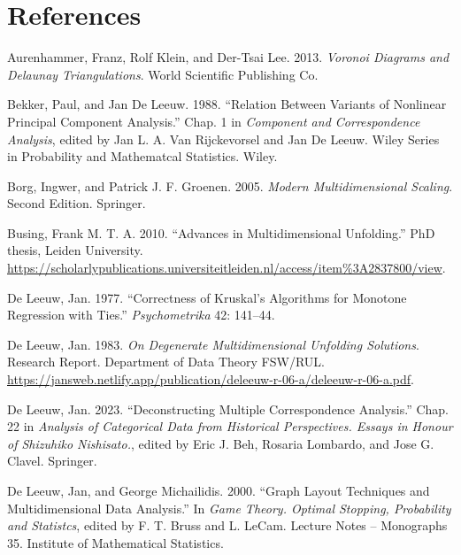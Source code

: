 \documentclass[
  12pt,
  letterpaper,
  DIV=11,
  numbers=noendperiod]{scrartcl}
\newlength{\cslhangindent}
\newenvironment{CSLReferences}[2] %
 {\begin{list}{}{%
  \setlength{\itemindent}{0pt}
  \setlength{\leftmargin}{0pt}
  \setlength{\parsep}{0pt}
  \ifodd #1
   \setlength{\leftmargin}{\cslhangindent}
   \setlength{\itemindent}{-1\cslhangindent}
  \fi
  \setlength{\itemsep}{#2\baselineskip}}}
 {\end{list}}
\newcommand{\sectionbreak}{\clearpage}
\begin{document}
\sectionbreak

\section*{References}\label{references}

\protect{}\label{refs}
\begin{CSLReferences}{1}{1}
Aurenhammer, Franz, Rolf Klein, and Der-Tsai Lee. 2013. \emph{Voronoi
Diagrams and Delaunay Triangulations}. World Scientific Publishing Co.

Bekker, Paul, and Jan De Leeuw. 1988. {``Relation Between Variants of
Nonlinear Principal Component Analysis.''} Chap. 1 in \emph{Component
and Correspondence Analysis}, edited by Jan L. A. Van Rijckevorsel and
Jan De Leeuw. Wiley Series in Probability and Mathematcal Statistics.
Wiley.

Borg, Ingwer, and Patrick J. F. Groenen. 2005. \emph{Modern
Multidimensional Scaling}. Second Edition. Springer.

Busing, Frank M. T. A. 2010. {``Advances in Multidimensional
Unfolding.''} PhD thesis, Leiden University.
\url{https://scholarlypublications.universiteitleiden.nl/access/item\%3A2837800/view}.

De Leeuw, Jan. 1977. {``Correctness of Kruskal's Algorithms for Monotone
Regression with Ties.''} \emph{Psychometrika} 42: 141--44.

De Leeuw, Jan. 1983. \emph{{On Degenerate Multidimensional Unfolding
Solutions}}. Research Report. Department of Data Theory FSW/RUL.
\url{https://jansweb.netlify.app/publication/deleeuw-r-06-a/deleeuw-r-06-a.pdf}.

De Leeuw, Jan. 2023. {``Deconstructing Multiple Correspondence
Analysis.''} Chap. 22 in \emph{Analysis of Categorical Data from
Historical Perspectives. Essays in Honour of Shizuhiko Nishisato.},
edited by Eric J. Beh, Rosaria Lombardo, and Jose G. Clavel. Springer.

De Leeuw, Jan, and George Michailidis. 2000. {``Graph Layout Techniques
and Multidimensional Data Analysis.''} In \emph{Game Theory. Optimal
Stopping, Probability and Statistcs}, edited by F. T. Bruss and L.
LeCam. Lecture Notes -- Monographs 35. Institute of Mathematical
Statistics.


\end{CSLReferences}
\end{document}
